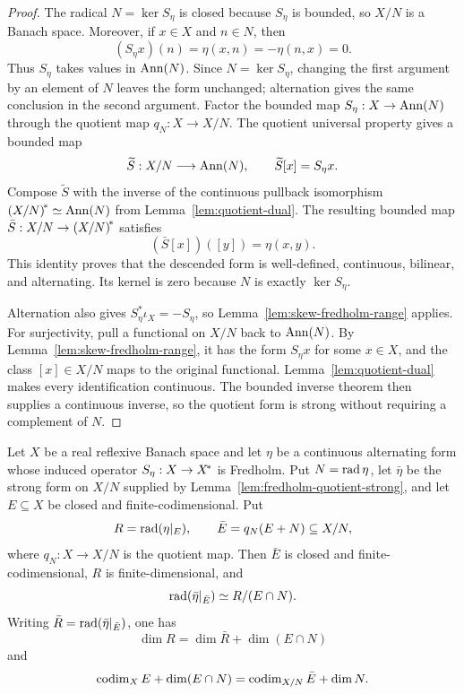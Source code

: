\begin{proof}
The radical $N=\ker S_\eta$ is closed because $S_\eta$ is bounded, so $X/N$ is a Banach space.
Moreover, if $x\in X$ and $n\in N$, then
\[
  (S_\eta x)(n)=\eta(x,n)=-\eta(n,x)=0.
\]
Thus $S_\eta$ takes values in $\operatorname{Ann}(N)$. Since $N=\ker S_\eta$, changing the first argument by an
element of $N$ leaves the form unchanged; alternation gives the same conclusion in the second
argument. Factor the bounded map $S_\eta:X\to\operatorname{Ann}(N)$ through the quotient map $q_N:X\to X/N$.
The quotient universal property gives a bounded map
\[
  \widetilde S:X/N\longrightarrow\operatorname{Ann}(N),\qquad \widetilde S[x]=S_\eta x.
\]
Compose $\widetilde S$ with the inverse of the continuous pullback isomorphism
${(X/N)}^{\!*}\simeq\operatorname{Ann}(N)$ from Lemma~\ref{lem:quotient-dual}. The resulting bounded map
$\bar S:X/N\to{(X/N)}^{\!*}$ satisfies
\[
  (\bar S[x])([y])=\eta(x,y).
\]
This identity proves that the descended form is well-defined, continuous, bilinear, and
alternating. Its kernel is zero because $N$ is exactly $\ker S_\eta$.

Alternation also gives $S_\eta^*\iota_X=-S_\eta$, so
Lemma~\ref{lem:skew-fredholm-range} applies. For surjectivity, pull a functional on $X/N$ back
to $\operatorname{Ann}(N)$. By Lemma~\ref{lem:skew-fredholm-range}, it has the form $S_\eta x$ for some
$x\in X$, and the class $[x]\in X/N$ maps to the original functional.
Lemma~\ref{lem:quotient-dual} makes every identification continuous. The bounded inverse theorem
then supplies a continuous inverse, so the quotient form is strong without requiring a complement
of $N$.
\end{proof}

\begin{lemma}\label{lem:radical-quotient}
Let $X$ be a real reflexive Banach space and let $\eta$ be a continuous alternating form whose
induced operator $S_\eta:X\to{X}^{\!*}$ is Fredholm. Put $N=\operatorname{rad}\eta$, let
$\bar\eta$ be the strong form on $X/N$ supplied by
Lemma~\ref{lem:fredholm-quotient-strong}, and let $E\subseteq X$ be closed and
finite-codimensional. Put
\[
  R=\operatorname{rad}(\eta|_E),
  \qquad
  \bar E=q_N(E+N)\subseteq X/N,
\]
where $q_N:X\to X/N$ is the quotient map. Then $\bar E$ is closed and finite-codimensional,
$R$ is finite-dimensional, and
\[
  \operatorname{rad}(\bar\eta|_{\bar E})\simeq R/(E\cap N).
\]
Writing $\bar R=\operatorname{rad}(\bar\eta|_{\bar E})$, one has
\[
  \dim R=\dim\bar R+\dim(E\cap N)
\]
and
\[
  \operatorname{codim}_XE+\dim(E\cap N)=\operatorname{codim}_{X/N}\bar E+\dim N.
\]
\leanok
\end{lemma}

